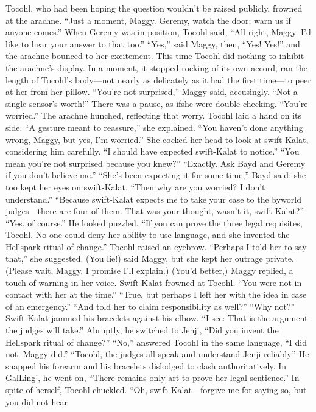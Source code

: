 \documentclass[9pt]{article}
\begin{document}
Tocohl, who had been hoping the question wouldn’t be raised publicly, frowned at the arachne. “Just
a moment, Maggy. Geremy, watch the door; warn us if anyone comes.” When Geremy was in position,
Tocohl said, “All right, Maggy. I’d like to hear your answer to that too.”
“Yes,” said Maggy, then, “Yes! Yes!” and the arachne bounced to her excitement. This time Tocohl
did nothing to inhibit the arachne’s display. In a moment, it stopped rocking of its own accord, ran the
length of Tocohl’s body—not nearly as delicately as it had the first time—to peer at her from her pillow.
“You’re not surprised,” Maggy said, accusingly. “Not a single sensor’s worth!” There was a pause, as ifshe were double-checking. “You’re worried.” The arachne hunched, reflecting that worry.
Tocohl laid a hand on its side. “A gesture meant to reassure,” she explained. “You haven’t done
anything wrong, Maggy, but yes, I’m worried.” She cocked her head to look at swift-Kalat, considering
him carefully. “I should have expected swift-Kalat to notice.”
“You mean you’re not surprised because you knew?”
“Exactly. Ask Bayd and Geremy if you don’t believe me.”
“She’s been expecting it for some time,” Bayd said; she too kept her eyes on swift-Kalat.
“Then why are you worried? I don’t understand.”
“Because swift-Kalat expects me to take your case to the byworld judges—there are four of them.
That was your thought, wasn’t it, swift-Kalat?”
“Yes, of course.” He looked puzzled. “If you can prove the three legal requisites, Tocohl. No one
could deny her ability to use language, and she invented the Hellspark ritual of change.”
Tocohl raised an eyebrow. “Perhaps I told her to say that,” she suggested.
(You lie!) said Maggy, but she kept her outrage private.
(Please wait, Maggy. I promise I’ll explain.)
(You’d better,) Maggy replied, a touch of warning in her voice.
Swift-Kalat frowned at Tocohl. “You were not in contact with her at the time.”
“True, but perhaps I left her with the idea in case of an emergency.”
“And told her to claim responsibility as well?”
“Why not?”
Swift-Kalat jammed his bracelets against his elbow. “I see: That is the argument the judges will take.”
Abruptly, he switched to Jenji, “Did you invent the Hellspark ritual of change?”
“No,” answered Tocohl in the same language, “I did not. Maggy did.”
“Tocohl, the judges all speak and understand Jenji reliably.” He snapped his forearm and his
bracelets dislodged to clash authoritatively. In GalLing’, he went on, “There remains only art to prove her
legal sentience.”
In spite of herself, Tocohl chuckled. “Oh, swift-Kalat—forgive me for saying so, but you did not hear
\end{document}
